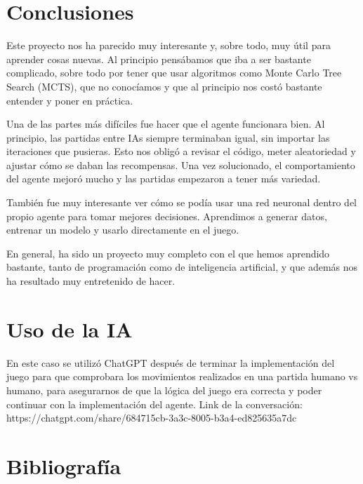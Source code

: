 \documentclass[conference]{IEEEtran}
\begin{document}
\section*{Conclusiones}
Este proyecto nos ha parecido muy interesante y, sobre todo, muy útil para aprender cosas nuevas. Al principio pensábamos que iba a ser bastante complicado, sobre todo por tener que usar algoritmos como Monte Carlo Tree Search (MCTS), que no conocíamos y que al principio nos costó bastante entender y poner en práctica.

Una de las partes más difíciles fue hacer que el agente funcionara bien. Al principio, las partidas entre IAs siempre terminaban igual, sin importar las iteraciones que pusieras. Esto nos obligó a revisar el código, meter aleatoriedad y ajustar cómo se daban las recompensas. Una vez solucionado, el comportamiento del agente mejoró mucho y las partidas empezaron a tener más variedad.

También fue muy interesante ver cómo se podía usar una red neuronal dentro del propio agente para tomar mejores decisiones. Aprendimos a generar datos, entrenar un modelo y usarlo directamente en el juego.

En general, ha sido un proyecto muy completo con el que hemos aprendido bastante, tanto de programación como de inteligencia artificial, y que además nos ha resultado muy entretenido de hacer.

\section*{Uso de la IA}
En este caso se utilizó ChatGPT después de terminar la implementación del juego para que comprobara los movimientos realizados en una partida humano vs humano, para asegurarnos de que la lógica del juego era correcta y poder continuar con la implementación del agente. Link de la conversación: https://chatgpt.com/share/684715cb-3a3c-8005-b3a4-ed825635a7dc
\section*{Bibliografía}
\end{document}
